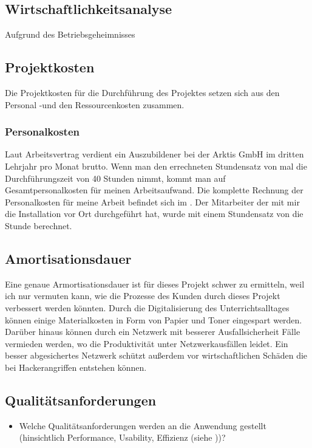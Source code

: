 \subsection{Wirtschaftlichkeitsanalyse}
\label{sec:Wirtschaftlichkeitsanalyse}
Aufgrund des Betriebsgeheimnisses 

\subsection{Projektkosten}
\label{sec:Projektkosten}
Die Projektkosten für die Durchführung des Projektes setzen sich aus den Personal -und den Ressourcenkosten zusammen.
\subsubsection{Personalkosten}
Laut Arbeitsvertrag verdient ein Auszubildener bei der Arktis GmbH im dritten Lehrjahr pro Monat  brutto. 
Wenn man den errechneten Stundensatz von  mal die Durchführungszeit von 40 Stunden nimmt, kommt man auf  Gesamtpersonalkosten für meinen Arbeitsaufwand. Die komplette Rechnung der Personalkosten für meine Arbeit befindet sich im . 
Der Mitarbeiter der mit mir die Installation vor Ort durchgeführt hat, wurde mit einem Stundensatz von  die Stunde berechnet.  

\subsection{Amortisationsdauer}
\label{sec:Amortisationsdauer}
Eine genaue Armortisationsdauer ist für dieses Projekt schwer zu ermitteln, weil ich nur vermuten kann, wie die Prozesse des Kunden durch dieses Projekt verbessert werden könnten. Durch die Digitalisierung des Unterrichtsalltages können einige Materialkosten in Form von Papier und Toner eingespart werden. Darüber hinaus können durch ein Netzwerk mit besserer Ausfallsicherheit Fälle vermieden werden, wo die Produktivität unter Netzwerkausfällen leidet. Ein besser abgesichertes Netzwerk schützt außerdem vor wirtschaftlichen Schäden die bei Hackerangriffen entstehen können. 

\subsection{Qualitätsanforderungen}
\label{sec:Qualitaetsanforderungen}
\begin{itemize}
	\item Welche Qualitätsanforderungen werden an die Anwendung gestellt (\zB hinsichtlich Performance, Usability, Effizienz \etc (siehe \citet{ISO9126}))?
\end{itemize}


